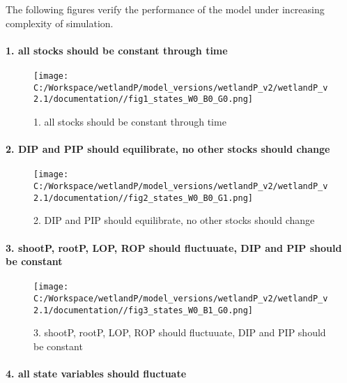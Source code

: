 \documentclass[
]{article}
\begin{document}
The following figures verify the performance of the model under
increasing complexity of simulation.

\hypertarget{all-stocks-should-be-constant-through-time}{%
\paragraph{1. all stocks should be constant through
time}\label{all-stocks-should-be-constant-through-time}}

\begin{figure}
\centering
\texttt{[image: C:/Workspace/wetlandP/model\_versions/wetlandP\_v2/wetlandP\_v2.1/documentation//fig1\_states\_W0\_B0\_G0.png]}
\caption{1. all stocks should be constant through time}
\end{figure}

\hypertarget{dip-and-pip-should-equilibrate-no-other-stocks-should-change}{%
\paragraph{2. DIP and PIP should equilibrate, no other stocks should
change}\label{dip-and-pip-should-equilibrate-no-other-stocks-should-change}}

\begin{figure}
\centering
\texttt{[image: C:/Workspace/wetlandP/model\_versions/wetlandP\_v2/wetlandP\_v2.1/documentation//fig2\_states\_W0\_B0\_G1.png]}
\caption{2. DIP and PIP should equilibrate, no other stocks should
change}
\end{figure}

\hypertarget{shootp-rootp-lop-rop-should-fluctuuate-dip-and-pip-should-be-constant}{%
\paragraph{3. shootP, rootP, LOP, ROP should fluctuuate, DIP and PIP
should be
constant}\label{shootp-rootp-lop-rop-should-fluctuuate-dip-and-pip-should-be-constant}}

\begin{figure}
\centering
\texttt{[image: C:/Workspace/wetlandP/model\_versions/wetlandP\_v2/wetlandP\_v2.1/documentation//fig3\_states\_W0\_B1\_G0.png]}
\caption{3. shootP, rootP, LOP, ROP should fluctuuate, DIP and PIP
should be constant}
\end{figure}

\hypertarget{all-state-variables-should-fluctuate}{%
\paragraph{4. all state variables should
fluctuate}\label{all-state-variables-should-fluctuate}}
\end{document}
